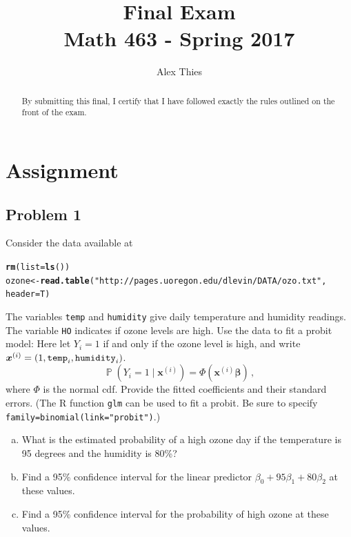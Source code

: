\documentclass{amsart}\usepackage[]{graphicx}\usepackage[]{color}
\author{Alex Thies}
\title{Final Exam \\ Math 463 - Spring 2017}
\makeatletter
\newcommand{\hlstr}[1]{\textcolor[rgb]{0.192,0.494,0.8}{#1}}%
\newcommand{\hlstd}[1]{\textcolor[rgb]{0.345,0.345,0.345}{#1}}%
\newcommand{\hlkwb}[1]{\textcolor[rgb]{0.69,0.353,0.396}{#1}}%
\newcommand{\hlkwc}[1]{\textcolor[rgb]{0.333,0.667,0.333}{#1}}%
\newcommand{\hlkwd}[1]{\textcolor[rgb]{0.737,0.353,0.396}{\textbf{#1}}}%
\newenvironment{kframe}{%
 \def\at@end@of@kframe{}%
 \ifinner\ifhmode%
  \def\at@end@of@kframe{\end{minipage}}%
  \begin{minipage}{\columnwidth}%
 \fi\fi%
 \def\FrameCommand##1{\hskip\@totalleftmargin \hskip-\fboxsep
 \colorbox{shadecolor}{##1}\hskip-\fboxsep
     \hskip-\linewidth \hskip-\@totalleftmargin \hskip\columnwidth}%
 \MakeFramed {\advance\hsize-\width
   \@totalleftmargin\z@ \linewidth\hsize
   \@setminipage}}%
 {\par\unskip\endMakeFramed%
 \at@end@of@kframe}
\newenvironment{knitrout}{}{} %
\DeclareMathOperator{\Prob}{\mathbb{P}}
\newcommand{\bvec}[1]{{\boldsymbol #1}}
\makeatother
\begin{document}
	\begin{abstract}
		By submitting this final, I certify that I have followed exactly the rules outlined on the front of the exam.
	\end{abstract}

	\maketitle

	\section{Assignment} %
	\label{sec:assignment}
		\subsection{Problem 1} %
		\label{sub:problem_1}
		Consider the data available at
\begin{knitrout}
\color{fgcolor}\begin{kframe}
\begin{alltt}
\hlkwd{rm}\hlstd{(}\hlkwc{list}\hlstd{=}\hlkwd{ls}\hlstd{())}
\hlstd{ozone} \hlkwb{<-} \hlkwd{read.table}\hlstd{(}\hlstr{"http://pages.uoregon.edu/dlevin/DATA/ozo.txt"}\hlstd{,}
                    \hlkwc{header}\hlstd{=T)}
\end{alltt}
\end{kframe}
\end{knitrout}
		The variables \verb|temp| and \verb|humidity| give daily temperature and humidity readings.
		The variable \verb|HO| indicates if ozone levels are high.
		Use the data to fit a probit model:
		Here let $Y_i = 1$ if and only if the ozone level is high, and write $\bvec{x}^{(i)} = (1, {\tt temp}_i, {\tt humidity}_i)$.
		\[
		\Prob(Y_i = 1 \mid \bvec{x}^{(i)}) = \Phi( \bvec{x}^{(i)} \bvec{\beta}) \,,
		\]
		where $\Phi$ is the normal cdf.
		Provide the fitted coefficients and their standard errors.
		(The R function \verb|glm| can be used to fit a probit. Be sure to specify \verb|family=binomial(link="probit")|.)
		\begin{enumerate}[(a)]
		\item What is the estimated probability of a high ozone day if the temperature is 95 degrees and the humidity is 80\%?
		\item Find a 95\% confidence interval for the linear predictor $\beta_0 + 95\beta_1 + 80\beta_2$ at these values.
		\item Find a 95\% confidence interval for the probability  of high ozone at these values.
		\end{enumerate}
\end{document}
